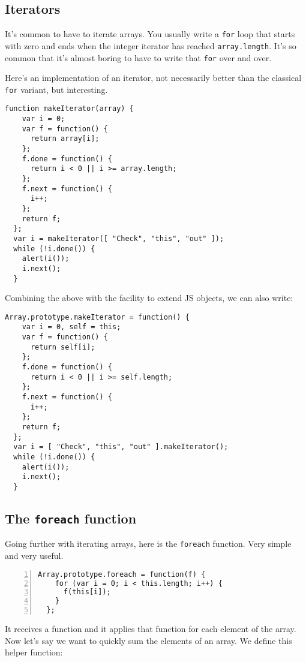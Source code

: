 \subsection{Iterators}

It's common to have to iterate arrays.  You usually write a \lstinline{for}
loop that starts with zero and ends when the integer iterator has reached
\lstinline{array.length}.  It's so common that it's almost boring to have to
write that \lstinline{for} over and over.

Here's an implementation of an iterator, not necessarily better than the
classical \lstinline{for} variant, but interesting.

\begin{lstlisting}[nolol]
  function makeIterator(array) {
    var i = 0;
    var f = function() {
      return array[i];
    };
    f.done = function() {
      return i < 0 || i >= array.length;
    };
    f.next = function() {
      i++;
    };
    return f;
  };
  var i = makeIterator([ "Check", "this", "out" ]);
  while (!i.done()) {
    alert(i());
    i.next();
  }
\end{lstlisting}

Combining the above with the facility to extend JS objects, we can also write:

\begin{lstlisting}[nolol]
  Array.prototype.makeIterator = function() {
    var i = 0, self = this;
    var f = function() {
      return self[i];
    };
    f.done = function() {
      return i < 0 || i >= self.length;
    };
    f.next = function() {
      i++;
    };
    return f;
  };
  var i = [ "Check", "this", "out" ].makeIterator();
  while (!i.done()) {
    alert(i());
    i.next();
  }
\end{lstlisting}

\subsection{The \texttt{foreach} function}

Going further with iterating arrays, here is the \lstinline{foreach}
function.  Very simple and very useful.

\begin{lstlisting}[nolol,name=ForeachSample1,numbers=left]
  Array.prototype.foreach = function(f) {
    for (var i = 0; i < this.length; i++) {
      f(this[i]);
    }
  };
\end{lstlisting}

It receives a function and it applies that function for each element of the
array.  Now let's say we want to quickly sum the elements of an array.  We
define this helper function:

